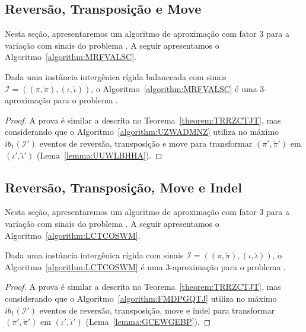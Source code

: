 \subsection{Reversão, Transposição e Move}

Nesta seção, apresentaremos um algoritmo de aproximação com fator $3$ para a variação com sinais do problema \SbIRTM{}. A seguir apresentamos o Algoritmo~\ref{algorithm:MRFVALSC}.



\begin{theorem}\label{theorem:SIMBVUPO}
Dada uma instância intergênica rígida balanceada com sinais $\mathcal{I}=((\pi,\breve\pi),(\iota,\breve\iota))$, o Algoritmo~\ref{algorithm:MRFVALSC} é uma $3$-aproximação para o problema \SbIRTM{}.
\end{theorem}
\begin{proof}
A prova é similar a descrita no Teorema~\ref{theorem:TRRZCTJT}, mas considerando que o Algoritmo~\ref{algorithm:UZWADMNZ} utiliza no máximo $ib_1(\mathcal{I'})$ eventos de reversão, transposição e move para transformar $(\pi',\breve\pi')$ em $(\iota',\breve\iota')$ (Lema~\ref{lemma:UUWLBHHA}).
\end{proof}

\subsection{Reversão, Transposição, Move e Indel}

Nesta seção, apresentaremos um algoritmo de aproximação com fator $3$ para a variação com sinais do problema \SbIRTMI{}. A seguir apresentamos o Algoritmo~\ref{algorithm:LCTCOSWM}.



\begin{theorem}\label{theorem:KKKBVPAY}
Dada uma instância intergênica rígida com sinais $\mathcal{I}=((\pi,\breve\pi),(\iota,\breve\iota))$, o Algoritmo~\ref{algorithm:LCTCOSWM} é uma $3$-aproximação para o problema \SbIRTMI{}.
\end{theorem}
\begin{proof}
A prova é similar a descrita no Teorema~\ref{theorem:TRRZCTJT}, mas considerando que o Algoritmo~\ref{algorithm:FMDPGQTJ} utiliza no máximo $ib_1(\mathcal{I'})$ eventos de reversão, transposição, move e indel para transformar $(\pi',\breve\pi')$ em $(\iota',\breve\iota')$ (Lema~\ref{lemma:GCEWGEBP}).
\end{proof}

